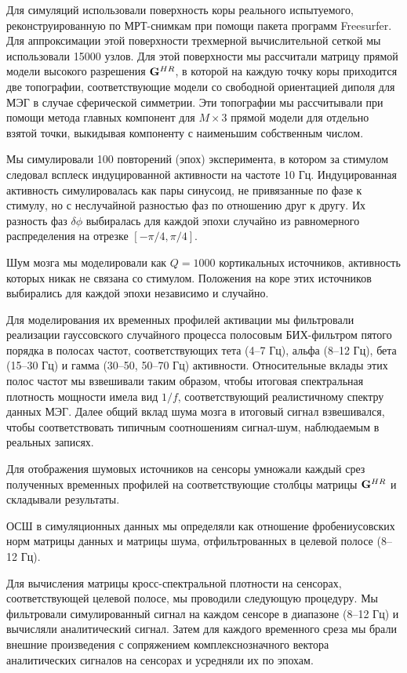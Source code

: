 Для симуляций использовали поверхность коры реального испытуемого,
реконструированную по МРТ-снимкам при помощи пакета программ Freesurfer.
Для аппроксимации этой поверхности трехмерной вычислительной сеткой мы
использовали 15000 узлов. Для этой поверхности мы рассчитали матрицу прямой модели
высокого разрешения $\mathbf{G}^{HR}$, в которой на каждую точку коры приходится
две топографии, соответствующие модели со свободной ориентацией диполя для МЭГ
в случае сферической симметрии. Эти топографии мы рассчитывали при помощи метода главных
компонент для $M \times 3$ прямой модели для отдельно взятой точки, выкидывая
компоненту с наименьшим собственным числом.

Мы симулировали 100 повторений (эпох) эксперимента, в котором за стимулом следовал
всплеск индуцированной активности на частоте 10 Гц. Индуцированная активность
симулировалась как пары синусоид, не привязанные по фазе к стимулу, но с неслучайной
разностью фаз по отношению друг к другу. Их разность фаз $\delta\phi$ выбиралась
для каждой эпохи случайно из равномерного распределения на отрезке $[-\pi/4, \pi/4]$.

Шум мозга мы моделировали как $Q=1000$ кортикальных источников, активность которых
никак не связана со стимулом. Положения на коре этих источников
выбирались для каждой эпохи независимо и случайно.

Для моделирования их временных профилей активации мы фильтровали реализации гауссовского
случайного процесса полосовым БИХ-фильтром пятого порядка в полосах частот,
соответствующих тета (4--7 Гц), альфа (8--12 Гц), бета (15--30 Гц) и гамма (30--50, 50--70 Гц)
активности. Относительные вклады этих полос частот мы взвешивали таким образом, чтобы
итоговая спектральная плотность мощности имела вид $1/f$, соответствующий реалистичному
спектру данных МЭГ. Далее общий вклад шума мозга в итоговый сигнал взвешивался,
чтобы соответствовать типичным соотношениям сигнал-шум, наблюдаемым в реальных
записях.

Для отображения шумовых источников на сенсоры умножали каждый срез полученных временных
профилей на соответствующие столбцы матрицы $\mathbf{G}^{HR}$ и складывали результаты.

ОСШ в симуляционных данных мы определяли как отношение фробениусовских
норм матрицы данных и матрицы шума, отфильтрованных в целевой полосе (8--12 Гц).

Для вычисления матрицы кросс-спектральной плотности на сенсорах, соответствующей целевой полосе,
мы проводили следующую процедуру.
Мы фильтровали симулированный сигнал на каждом сенсоре в диапазоне (8--12 Гц) и
вычисляли аналитический сигнал.
Затем для каждого временного среза мы брали внешние произведения с сопряжением
комплекснозначного вектора аналитических сигналов на сенсорах и усредняли их по эпохам.

